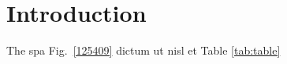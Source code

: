 \section{Introduction}
\label{introduction}

The spa Fig.~\ref{125409} dictum ut nisl et Table \ref{tab:table}

